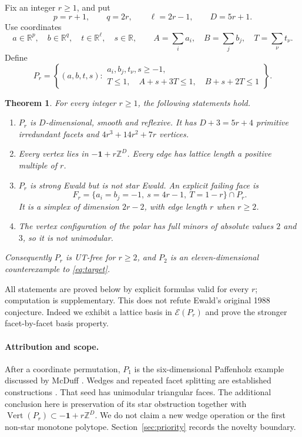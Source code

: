 \documentclass[11pt]{article}
\newtheorem{theorem}{Theorem}[section]
\theoremstyle{remark}\newtheorem{remark}[theorem]{Remark}
\newcommand{\Z}{\mathbb Z}
\newcommand{\R}{\mathbb R}
\newcommand{\E}{\mathcal E}
\newcommand{\one}{\mathbf1}
\DeclareMathOperator{\Verts}{Vert}
\begin{document}
Fix an integer \(r\ge1\), and put
\[
 p=r+1,\qquad q=2r,\qquad \ell=2r-1,\qquad D=5r+1.
\]
Use coordinates
\[
 a\in\R^p,\quad b\in\R^q,\quad t\in\R^\ell,\quad s\in\R,
 \qquad A=\sum_i a_i,\quad B=\sum_jb_j,\quad T=\sum_\nu t_\nu .
\]
Define
\begin{equation}\label{eq:polytope}
\boxed{\quad
P_r=\left\{(a,b,t,s):
\begin{array}{l}
a_i,b_j,t_\nu,s\ge-1,\\
T\le1,\quad A+s+3T\le1,\quad B+s+2T\le1
\end{array}
\right\}.\quad}
\end{equation}

\begin{theorem}\label{thm:main}
For every integer \(r\ge1\), the following statements hold.
\begin{enumerate}
\item \(P_r\) is \(D\)-dimensional, smooth and reflexive. It has
\(D+3=5r+4\) primitive irredundant facets and \(4r^3+14r^2+7r\) vertices.
\item Every vertex lies in \(-\one+r\Z^D\). Every edge has lattice length
a positive multiple of \(r\).
\item \(P_r\) is strong Ewald but is not star Ewald. An explicit failing face is
\begin{equation}\label{eq:badface}
 F_r=\{a_i=b_j=-1,\ s=4r-1,\ T=1-r\}\cap P_r .
\end{equation}
It is a simplex of dimension \(2r-2\), with edge length \(r\) when \(r\ge2\).
\item The vertex configuration of the polar has full minors of absolute
values \(2\) and \(3\), so it is not unimodular.
\end{enumerate}
Consequently \(P_r\) is UT-free for \(r\ge2\), and \(P_2\) is an
eleven-dimensional counterexample to \eqref{eq:target}.
\end{theorem}

All statements are proved below by explicit formulas valid for every
\(r\); computation is supplementary.
This does not refute Ewald's original 1988 conjecture.
Indeed we exhibit a lattice basis in \(\E(P_r)\) and prove the stronger
facet-by-facet basis property.

\paragraph{Attribution and scope.}
After a coordinate permutation, \(P_1\) is the six-dimensional
Paffenholz example discussed by McDuff
\cite[Section~2.1, Lemma~2.6]{McDuff11}.
Wedges and repeated facet splitting are established constructions
\cite{HM06,McDuff11}. That seed has unimodular triangular faces.
The additional conclusion here is preservation of its star obstruction
together with \(\Verts(P_r)\subset-\one+r\Z^D\).
We do not claim a new wedge operation or the first non-star monotone
polytope. Section~\ref{sec:priority} records the novelty boundary.
\end{document}
